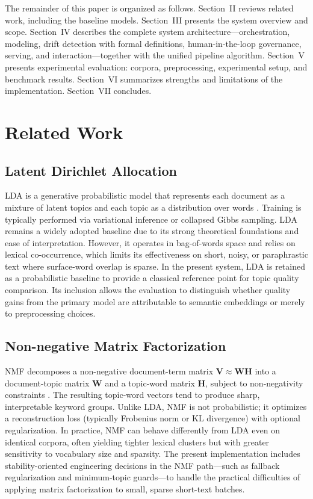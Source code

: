 \documentclass[conference]{IEEEtran}
\newcommand{\lda}{LDA\xspace}
\newcommand{\nmf}{NMF\xspace}
\begin{document}
The remainder of this paper is organized as follows. Section~II reviews related work, including the baseline models. Section~III presents the system overview and scope. Section~IV describes the complete system architecture---orchestration, modeling, drift detection with formal definitions, human-in-the-loop governance, serving, and interaction---together with the unified pipeline algorithm. Section~V presents experimental evaluation: corpora, preprocessing, experimental setup, and benchmark results. Section~VI summarizes strengths and limitations of the implementation. Section~VII concludes.

\section{Related Work}
\subsection{Latent Dirichlet Allocation}
\lda is a generative probabilistic model that represents each document as a mixture of latent topics and each topic as a distribution over words \cite{lda}. Training is typically performed via variational inference or collapsed Gibbs sampling. \lda remains a widely adopted baseline due to its strong theoretical foundations and ease of interpretation. However, it operates in bag-of-words space and relies on lexical co-occurrence, which limits its effectiveness on short, noisy, or paraphrastic text where surface-word overlap is sparse. In the present system, \lda is retained as a probabilistic baseline to provide a classical reference point for topic quality comparison. Its inclusion allows the evaluation to distinguish whether quality gains from the primary model are attributable to semantic embeddings or merely to preprocessing choices.

\subsection{Non-negative Matrix Factorization}
\nmf decomposes a non-negative document-term matrix $\mathbf{V} \approx \mathbf{W}\mathbf{H}$ into a document-topic matrix $\mathbf{W}$ and a topic-word matrix $\mathbf{H}$, subject to non-negativity constraints \cite{nmf}. The resulting topic-word vectors tend to produce sharp, interpretable keyword groups. Unlike \lda, \nmf is not probabilistic; it optimizes a reconstruction loss (typically Frobenius norm or KL divergence) with optional regularization. In practice, \nmf can behave differently from \lda even on identical corpora, often yielding tighter lexical clusters but with greater sensitivity to vocabulary size and sparsity. The present implementation includes stability-oriented engineering decisions in the \nmf path---such as fallback regularization and minimum-topic guards---to handle the practical difficulties of applying matrix factorization to small, sparse short-text batches.
\end{document}
